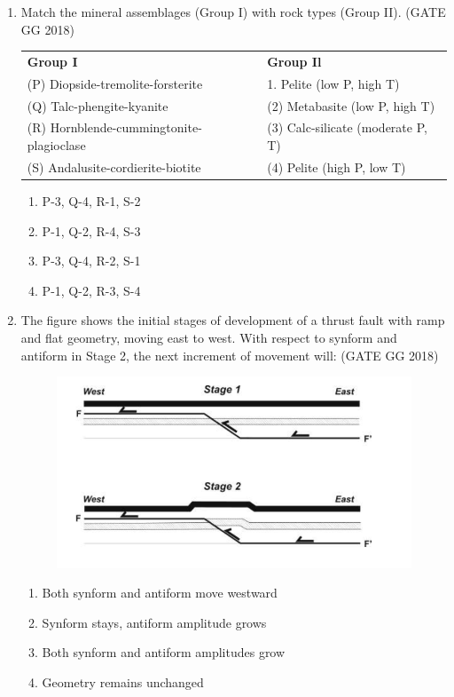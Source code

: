 \documentclass[journal]{IEEEtran}
\begin{document}
\begin{enumerate}[start=1]
\item Match the mineral assemblages (Group I) with rock types (Group II).
\hfill(GATE GG 2018)\\
\begin{tabular}{ l l }
\textbf{Group I} & \textbf{Group Il}\\
(P) Diopside-tremolite-forsterite & 1. Pelite (low P, high T)\\
(Q) Talc-phengite-kyanite &  (2) Metabasite (low P, high T)\\
 (R) Hornblende-cummingtonite-plagioclase & (3) Calc-silicate (moderate P, T)\\
 (S) Andalusite-cordierite-biotite & (4) Pelite (high P, low T)  
\end{tabular}
\begin{multicols}{2}
\begin{enumerate}
\item P-3, Q-4, R-1, S-2
\item P-1, Q-2, R-4, S-3
\item P-3, Q-4, R-2, S-1
\item P-1, Q-2, R-3, S-4
\end{enumerate}
\end{multicols}

\item The figure shows the initial stages of development of a thrust fault  with ramp and flat geometry, moving east to  west. With respect to synform and antiform in Stage 2, the next increment of movement will:  
\hfill(GATE GG 2018)
\begin{figure}[H]
        \centering
        \includegraphics[width=0.6\columnwidth]{figs/07.png}
        \caption*{}
        \label{fig:q10}
    \end{figure}
\begin{enumerate}
\item Both synform and antiform move westward
\item Synform stays, antiform amplitude grows
\item Both synform and antiform amplitudes grow
\item Geometry remains unchanged
\end{enumerate}


\end{enumerate}
\end{document}

